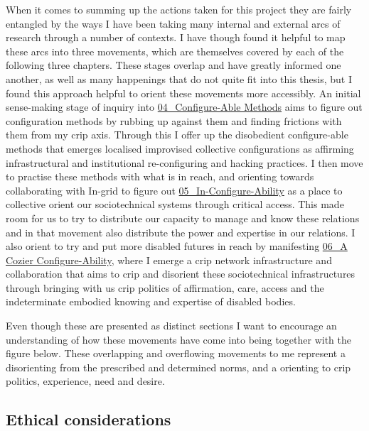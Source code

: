 When it comes to summing up the actions taken for this project they are
fairly entangled by the ways I have been taking many internal and
external arcs of research through a number of contexts. I have though
found it helpful to map these arcs into three movements, which are
themselves covered by each of the following three chapters. These stages
overlap and have greatly informed one another, as well as many
happenings that do not quite fit into this thesis, but I found this
approach helpful to orient these movements more accessibly. An initial
sense-making stage of inquiry into
\href{../../04_Configure-able_Methods/04_Configure-Able\%20Methods.md}{04\_Configure-Able
Methods} aims to figure out configuration methods by rubbing up against
them and finding frictions with them from my crip axis. Through this I
offer up the disobedient configure-able methods that emerges localised
improvised collective configurations as affirming infrastructural and
institutional re-configuring and hacking practices. I then move to
practise these methods with what is in reach, and orienting towards
collaborating with In-grid to figure out
\href{../../05_In-Configure-Ability/05_In-Configure-Ability.md}{05\_In-Configure-Ability}
as a place to collective orient our sociotechnical systems through
critical access. This made room for us to try to distribute our capacity
to manage and know these relations and in that movement also distribute
the power and expertise in our relations. I also orient to try and put
more disabled futures in reach by manifesting
\href{../../06_A\%20Cozier\%20Configure-Ability/06_A\%20Cozier\%20Configure-Ability.md}{06\_A
Cozier Configure-Ability}, where I emerge a crip network infrastructure
and collaboration that aims to crip and disorient these sociotechnical
infrastructures through bringing with us crip politics of affirmation,
care, access and the indeterminate embodied knowing and expertise of
disabled bodies.

Even though these are presented as distinct sections I want to encourage
an understanding of how these movements have come into being together
with the figure below. These overlapping and overflowing movements to me
represent a disorienting from the prescribed and determined norms, and a
orienting to crip politics, experience, need and desire.

\hypertarget{ethical-considerations}{%
\subsection[Ethical
considerations]{\texorpdfstring{\protect\hypertarget{anchor}{}{}Ethical
considerations}{Ethical considerations}}\label{ethical-considerations}}

